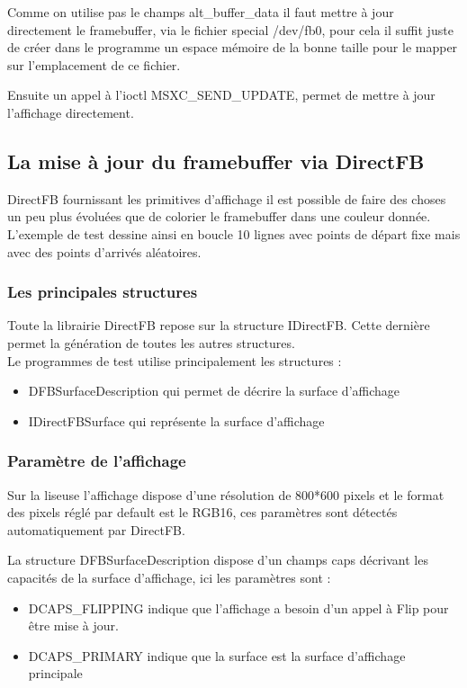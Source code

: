 Comme on utilise pas le champs alt_buffer_data il faut mettre à jour directement le framebuffer, via le fichier special /dev/fb0, pour cela il suffit juste de créer dans le programme un espace mémoire de la bonne taille pour le mapper sur l'emplacement de ce fichier.

Ensuite un appel à l'ioctl MSXC_SEND_UPDATE, permet de mettre à jour l'affichage directement.

\subsection{La mise à jour du framebuffer via DirectFB}

DirectFB fournissant les primitives d'affichage il est possible de faire des choses un peu plus
évoluées que de colorier le framebuffer dans une couleur donnée.
L'exemple de test dessine ainsi en boucle 10 lignes avec points de départ fixe mais avec des points d'arrivés aléatoires.

\subsubsection{Les principales structures}

Toute la librairie DirectFB repose sur la structure IDirectFB. Cette dernière permet la génération de toutes les autres structures.~\\
 Le programmes de test utilise principalement les structures :
\begin{itemize}
	\item DFBSurfaceDescription qui permet de décrire la surface d'affichage
	\item IDirectFBSurface qui représente la surface d'affichage
\end{itemize}

\subsubsection{Paramètre de l'affichage}

Sur la liseuse l'affichage dispose d'une résolution de 800*600 pixels et le format des pixels 
réglé par default est le RGB16, ces paramètres sont détectés automatiquement par DirectFB.

La structure DFBSurfaceDescription dispose d'un champs caps décrivant les capacités de la surface d'affichage, ici les paramètres sont : 
	\begin{itemize}
		\item DCAPS_FLIPPING
			indique que l'affichage a besoin d'un appel à Flip pour être mise à jour.
		\item DCAPS_PRIMARY
			indique que la surface est la surface d'affichage principale
	\end{itemize}

